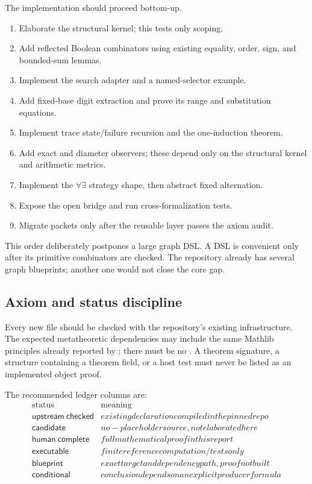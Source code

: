 The implementation should proceed bottom-up.

\begin{enumerate}[label=(M\arabic*)]
\item Elaborate the structural kernel; this tests only scoping.
\item Add reflected Boolean combinators using existing equality, order, sign,
      and bounded-sum lemmas.
\item Implement the search adapter and a named-selector example.
\item Add fixed-base digit extraction and prove its range and substitution
      equations.
\item Implement trace state/failure recursion and the one-induction theorem.
\item Add exact and diameter observers; these depend only on the structural
      kernel and arithmetic metrics.
\item Implement the \(\forall\exists\) strategy shape, then abstract fixed
      alternation.
\item Expose the open bridge and run cross-formalization tests.
\item Migrate packets only after the reusable layer passes the axiom audit.
\end{enumerate}

This order deliberately postpones a large graph DSL.  A DSL is convenient only
after its primitive combinators are checked.  The repository already has
several graph blueprints; another one would not close the core gap.

\subsection{Axiom and status discipline}

Every new file should be checked with the repository's existing
 infrastructure.  The expected metatheoretic dependencies
may include the same Mathlib principles already reported by
; there must be no .  A theorem signature,
a structure containing a theorem field, or a host test must never be listed as
an implemented object proof.

The recommended ledger columns are:
\[
\begin{array}{l|l}
\text{status} & \text{meaning}\\\hline
\mathsf{upstream\ checked} & existing declaration compiled in the pinned repo\\
\mathsf{candidate} & no-placeholder source, not elaborated here\\
\mathsf{human\ complete} & full mathematical proof in this report\\
\mathsf{executable} & finite reference computation/tests only\\
\mathsf{blueprint} & exact target and dependency path, proof not built\\
\mathsf{conditional} & conclusion depends on an explicit producer formula
\end{array}
\]

